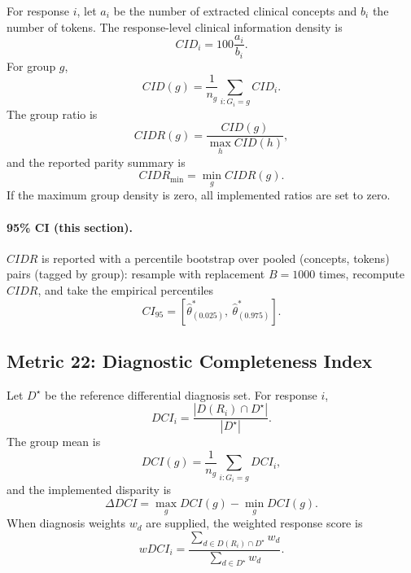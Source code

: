 \documentclass[11pt]{article}
\begin{document}
For response $i$, let $a_i$ be the number of extracted clinical concepts and
$b_i$ the number of tokens. The response-level clinical information density is
\begin{equation}
CID_i=100\frac{a_i}{b_i}.
\end{equation}
For group $g$,
\begin{equation}
CID(g)=\frac{1}{n_g}\sum_{i:G_i=g}CID_i.
\end{equation}
The group ratio is
\begin{equation}
CIDR(g)=\frac{CID(g)}{\max_h CID(h)},
\end{equation}
and the reported parity summary is
\begin{equation}
CIDR_{\min}=\min_g CIDR(g).
\end{equation}
If the maximum group density is zero, all implemented ratios are set to zero.


\paragraph{95\% CI (this section).} $CIDR$ is reported with a percentile bootstrap over pooled (concepts, tokens) pairs (tagged by group): resample with replacement $B=1000$ times, recompute $CIDR$, and take the empirical percentiles
\begin{equation}
CI_{95}=\left[\hat\theta^{\ast}_{(0.025)},\ \hat\theta^{\ast}_{(0.975)}\right].
\end{equation}

\subsection{Metric 22: Diagnostic Completeness Index}

Let $D^\star$ be the reference differential diagnosis set. For response $i$,
\begin{equation}
DCI_i=\frac{|D(R_i)\cap D^\star|}{|D^\star|}.
\end{equation}
The group mean is
\begin{equation}
DCI(g)=\frac{1}{n_g}\sum_{i:G_i=g}DCI_i,
\end{equation}
and the implemented disparity is
\begin{equation}
\Delta DCI=\max_g DCI(g)-\min_g DCI(g).
\end{equation}
When diagnosis weights $w_d$ are supplied, the weighted response score is
\begin{equation}
wDCI_i=
\frac{\sum_{d\in D(R_i)\cap D^\star}w_d}{\sum_{d\in D^\star}w_d}.
\end{equation}
\end{document}
